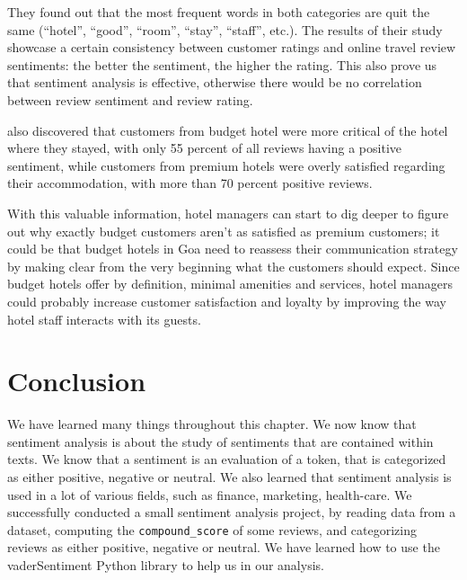 	They found out that the most frequent words in both categories are quit the same (``hotel'', ``good'', ``room'', ``stay'', ``staff'', etc.). The results of their study showcase a certain consistency between customer ratings and online travel review sentiments: the better the sentiment, the higher the rating. This also prove us that sentiment analysis is effective, otherwise there would be no correlation between review sentiment and review rating.
	
	\cite{geetha_relationship_2017} also discovered that customers from budget hotel were more critical of the hotel where they stayed, with only 55 percent of all reviews having a positive sentiment, while customers from premium hotels were overly satisfied regarding their accommodation, with more than 70 percent positive reviews.
	
	With this valuable information, hotel managers can start to dig deeper to figure out why exactly budget customers aren't as satisfied as premium customers; it could be that budget hotels in Goa need to reassess their communication strategy by making clear from the very beginning what the customers should expect. Since budget hotels offer by definition, minimal amenities and services, hotel managers could probably increase customer satisfaction and loyalty by improving the way hotel staff interacts with its guests.
	
	\section{Conclusion}
	We have learned many things throughout this chapter. We now know that sentiment analysis is about the study of sentiments that are contained within texts. We know that a sentiment is an evaluation of a token, that is categorized as either positive, negative or neutral. We also learned that sentiment analysis is used in a lot of various fields, such as finance, marketing, health-care. We successfully conducted a small sentiment analysis project, by reading data from a dataset, computing the \verb|compound_score| of some reviews, and categorizing reviews as either positive, negative or neutral. We have learned how to use the vaderSentiment Python library to help us in our analysis.
	
